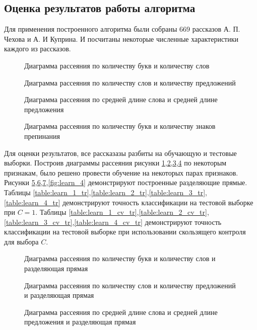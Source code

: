 \documentclass[%
bachelor,    %
subf,        %
href,        %
colorlinks,  %
]{disser}
\begin{document}
\subsection{Оценка результатов работы алгоритма}
Для применения построенного алгоритма были собраны 669 рассказов А. П. Чехова и А. И Куприна. И посчитаны некоторые численные характеристики каждого из рассказов.
\begin{figure}
	\centering		
	
	\caption{Диаграмма рассеяния по количеству букв и количеству слов}
	\label{fig:scatter_1}
\end{figure}
\begin{figure}
	\centering		
	
	\caption{Диаграмма рассеяния по количеству слов и количеству предложений}
	\label{fig:scatter_2}
\end{figure}
\begin{figure}
	\centering		
	
	\caption{Диаграмма рассеяния по средней длине слова и средней длине предложения }
	\label{fig:scatter_3}
\end{figure}

\begin{figure}
	\centering		
	
	\caption{Диаграмма рассеяния по количеству букв и количеству знаков препинания }
	\label{fig:scatter_4}
\end{figure}
Для оценки результатов, все рассказазы разбиты на обучающую и тестовые выборки.
Построив диаграммы рассеяния рисунки \ref{fig:scatter_1},\ref{fig:scatter_2},\ref{fig:scatter_3},\ref{fig:scatter_4} по некоторым признакам, было решено провести обучение на некоторых парах признаков.
Рисунки \ref{fig:learn_1},\ref{fig:learn_2},\ref{fig:learn_3},\ref{fig:learn_4} демонстрируют построенные разделяющие прямые. 
Таблицы \ref{table:learn_1_tr},\ref{table:learn_2_tr},\ref{table:learn_3_tr},\ref{table:learn_4_tr} демонстрируют точность классификации на тестовой выборке при $C=1$.
Таблицы \ref{table:learn_1_cv_tr},\ref{table:learn_2_cv_tr},\ref{table:learn_3_cv_tr},\ref{table:learn_4_cv_tr} демонстрируют точность классификации на тестовой выборке при использовании скользящего контроля для выбора $C$.
\begin{figure}
	\centering		
	
	\caption{Диаграмма рассеяния по количеству букв и количеству слов и разделяющая прямая}
	\label{fig:learn_1}
\end{figure}
\begin{figure}
	\centering		
	
	\caption{Диаграмма рассеяния по количеству слов и количеству предложений и разделяющая прямая}
	\label{fig:learn_2}
\end{figure}
\begin{figure}
	\centering		
	
	\caption{Диаграмма рассеяния по средней длине слова и средней длине предложения и разделяющая прямая}
	\label{fig:learn_3}
\end{figure}
\end{document}
